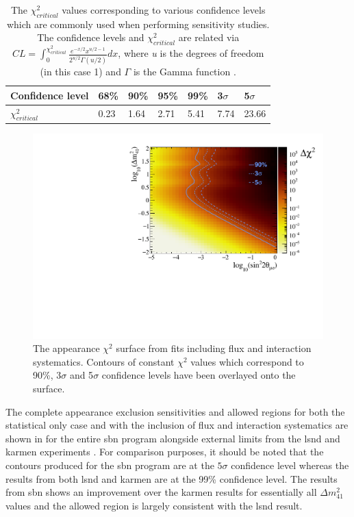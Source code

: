 \begin{table}[h!]
\begin{tabular}{lllllll}
 Confidence level & 68\% & 90\% & 95\% & 99\% & 3$\sigma$ & 5$\sigma$ \\ \hline
$\chi^2_{critical}$ & 0.23 & 1.64 & 2.71 & 5.41 & 7.74 & 23.66
\end{tabular}
\caption[$\chi^2_{critical}$ values for various confidence levels.]{The $\chi^2_{critical}$ values corresponding to various confidence levels which are commonly used when performing sensitivity studies. The confidence levels and $\chi^2_{critical}$ are related via $CL = \int_0^{\chi^2_{critical}} \frac{e^{-x/2}x^{u/2-1}}{2^{u/2}\Gamma(u/2)} dx$, where \textit{u} is the degrees of freedom (in this case 1) and $\Gamma$ is the Gamma function \cite{critical_chi2_book}.}
\label{table:critical_chi2_values}
\end{table}

\begin{figure}[h!]
    \centering
    \includegraphics[width = \largefigwidth]{figures-chap6/exclusion_contours/nue_app_03d1_chi2_surface.pdf}
    \caption[\nue appearance contours overlayed on the $\chi^2$ surface.]{The \nue appearance $\chi^2$ surface from fits including flux and interaction systematics. Contours of constant $\chi^2$ values which correspond to 90\%, 3$\sigma$ and 5$\sigma$ confidence levels have been overlayed onto the surface.}
    \label{fig:nue_app_chisq_surface}
\end{figure}


The complete \nue appearance exclusion sensitivities and allowed regions for both the statistical only case and with the inclusion of flux and interaction systematics are shown in  for the entire \gls{sbn} program alongside external limits from the \gls{lsnd} and \gls{karmen} experiments \cite{LSND_KARMEN_nue_app_contour}. For comparison purposes, it should be noted that the contours produced for the \gls{sbn} program are at the $5\sigma$ confidence level whereas the results from both \gls{lsnd} and \gls{karmen} are at the 99\% confidence level. The results from \gls{sbn} shows an improvement over the \gls{karmen} results for essentially all $\Delta m^2_{41}$ values and the allowed region is largely consistent with the \gls{lsnd} result. 


